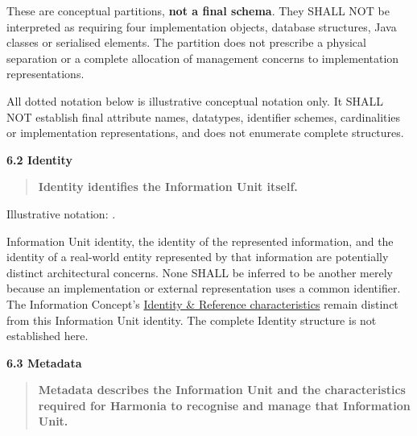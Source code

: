 These are conceptual partitions, \textbf{not a final schema}. They SHALL NOT be
interpreted as requiring four implementation objects, database structures,
Java classes or serialised elements. The partition does not prescribe a physical
separation or a complete allocation of management concerns to implementation
representations.



All dotted notation below is illustrative conceptual notation only. It SHALL
NOT establish final attribute names, datatypes, identifier schemes, cardinalities
or implementation representations, and does not enumerate complete structures.



\par\medskip\textbf{6.2 Identity}\par


\begin{quote}


\textbf{Identity identifies the Information Unit itself.}



\end{quote}


Illustrative notation: \texttt{}.



Information Unit identity, the identity of the represented information, and the
identity of a real-world entity represented by that information are potentially
distinct architectural concerns. None SHALL be inferred to be another merely
because an implementation or external representation uses a common identifier.
The Information Concept's \href{\detokenize{../../../../../../../../docs/markdown/04-information-architecture/metamodel/information-architecture-metamodel.md#31-identity--reference}}{Identity \& Reference characteristics}
remain distinct from this Information Unit identity. The complete Identity
structure is not established here.



\par\medskip\textbf{6.3 Metadata}\par


\begin{quote}


\textbf{Metadata describes the Information Unit and the characteristics required for Harmonia to recognise and manage that Information Unit.}



\end{quote}


